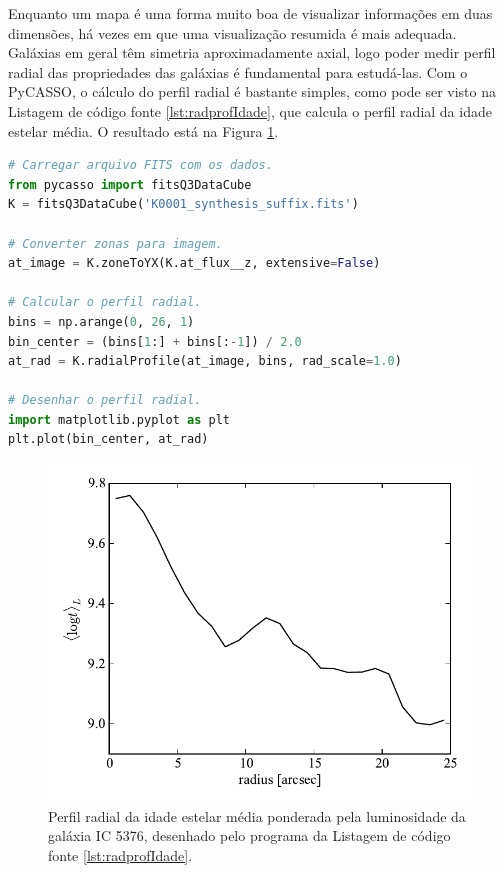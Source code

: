 Enquanto um mapa é uma forma muito boa de visualizar informações em duas
dimensões, há vezes em que uma visualização resumida é mais adequada. Galáxias
em geral têm simetria aproximadamente axial, logo poder medir perfil radial das
propriedades das galáxias é fundamental para estudá-las. Com o PyCASSO, o
cálculo do perfil radial é bastante simples, como pode ser visto na Listagem de
código fonte \ref{lst:radprofIdade}, que calcula o perfil radial da idade
estelar média. O resultado está na Figura \ref{fig:radprofIdade}.

\begin{lstlisting}[language=Python, caption={Programa para desenhar o perfil
radial da idade estelar média ponderada pela luminosidade.},
label={lst:radprofIdade}]
# Carregar arquivo FITS com os dados.
from pycasso import fitsQ3DataCube
K = fitsQ3DataCube('K0001_synthesis_suffix.fits')

# Converter zonas para imagem.
at_image = K.zoneToYX(K.at_flux__z, extensive=False)

# Calcular o perfil radial.
bins = np.arange(0, 26, 1)
bin_center = (bins[1:] + bins[:-1]) / 2.0
at_rad = K.radialProfile(at_image, bins, rad_scale=1.0)

# Desenhar o perfil radial.
import matplotlib.pyplot as plt
plt.plot(bin_center, at_rad)
\end{lstlisting}

\begin{figure}
	\includegraphics{figuras/radprof-idade}
	\caption[Perfil radial da idade estelar média da galáxia IC 5376] {Perfil
	radial da idade estelar média ponderada pela luminosidade da galáxia IC
	5376, desenhado pelo programa da Listagem de código fonte
	\ref{lst:radprofIdade}.}
	\label{fig:radprofIdade}
\end{figure}

